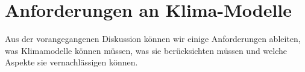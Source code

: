 %
%
%

\section{Anforderungen an Klima-Modelle\label{section:anforderungen}}
Aus der vorangegangenen Diskussion können wir einige Anforderungen
ableiten, was Klimamodelle können müssen, was sie berücksichten
müssen und welche Aspekte sie vernachlässigen können.


